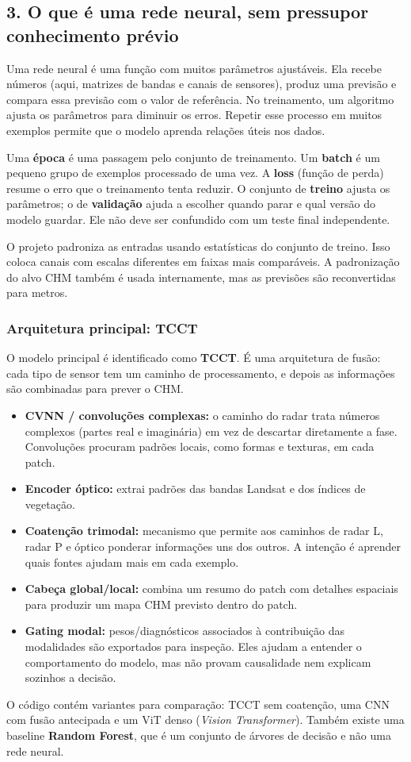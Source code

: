 \documentclass[11pt,a4paper]{article}
\begin{document}
\subsection{3. O que é uma rede neural, sem pressupor conhecimento prévio}
Uma rede neural é uma função com muitos parâmetros ajustáveis. Ela recebe números (aqui, matrizes de bandas e canais de sensores), produz uma previsão e compara essa previsão com o valor de referência. No treinamento, um algoritmo ajusta os parâmetros para diminuir os erros. Repetir esse processo em muitos exemplos permite que o modelo aprenda relações úteis nos dados.

Uma \textbf{época} é uma passagem pelo conjunto de treinamento. Um \textbf{batch} é um pequeno grupo de exemplos processado de uma vez. A \textbf{loss} (função de perda) resume o erro que o treinamento tenta reduzir. O conjunto de \textbf{treino} ajusta os parâmetros; o de \textbf{validação} ajuda a escolher quando parar e qual versão do modelo guardar. Ele não deve ser confundido com um teste final independente.

O projeto padroniza as entradas usando estatísticas do conjunto de treino. Isso coloca canais com escalas diferentes em faixas mais comparáveis. A padronização do alvo CHM também é usada internamente, mas as previsões são reconvertidas para metros.

\subsubsection{Arquitetura principal: TCCT}
O modelo principal é identificado como \textbf{TCCT}. É uma arquitetura de fusão: cada tipo de sensor tem um caminho de processamento, e depois as informações são combinadas para prever o CHM.

\begin{itemize}
\item \textbf{CVNN / convoluções complexas:} o caminho do radar trata números complexos (partes real e imaginária) em vez de descartar diretamente a fase. Convoluções procuram padrões locais, como formas e texturas, em cada patch.
\item \textbf{Encoder óptico:} extrai padrões das bandas Landsat e dos índices de vegetação.
\item \textbf{Coatenção trimodal:} mecanismo que permite aos caminhos de radar L, radar P e óptico ponderar informações uns dos outros. A intenção é aprender quais fontes ajudam mais em cada exemplo.
\item \textbf{Cabeça global/local:} combina um resumo do patch com detalhes espaciais para produzir um mapa CHM previsto dentro do patch.
\item \textbf{Gating modal:} pesos/diagnósticos associados à contribuição das modalidades são exportados para inspeção. Eles ajudam a entender o comportamento do modelo, mas não provam causalidade nem explicam sozinhos a decisão.
\end{itemize}
O código contém variantes para comparação: TCCT sem coatenção, uma CNN com fusão antecipada e um ViT denso (\emph{Vision Transformer}). Também existe uma baseline \textbf{Random Forest}, que é um conjunto de árvores de decisão e não uma rede neural.
\end{document}
